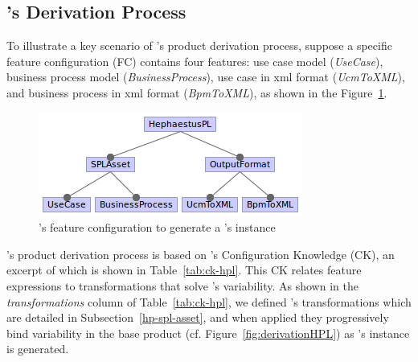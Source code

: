 
\subsection{\hpl's Derivation Process} 
\label{sec:hpl-derivation-process}

To illustrate a key scenario of \hpl's product derivation process, suppose a specific feature configuration (FC) contains four features: use case model (\emph{UseCase}), business process model (\emph{BusinessProcess}), use case in xml format (\emph{UcmToXML}), and business process in xml format (\emph{BpmToXML}), as shown in the Figure~\ref{fig:fc-ucm-bpm}.


\begin{figure}[t!]
\begin{center}
\includegraphics[scale=0.8]{imagens/fc-ucm-bpm.png}
\end{center}
\caption{\hpl's feature configuration to generate a \hpl's instance}
\label{fig:fc-ucm-bpm}
\end{figure}


\hpl's product derivation process is based on \hpl's Configuration Knowledge (CK), an excerpt of which is shown in Table~\ref{tab:ck-hpl}.  This CK relates feature expressions to transformations that solve \hpl{}'s variability.  As shown in the \textit{transformations} column of Table~\ref{tab:ck-hpl}, we defined \hpl's transformations which are detailed in Subsection~\ref{hp-spl-asset}, and when applied they progressively bind variability in the base product (cf. Figure~\ref{fig:derivationHPL}) as \hpl's instance is generated.


